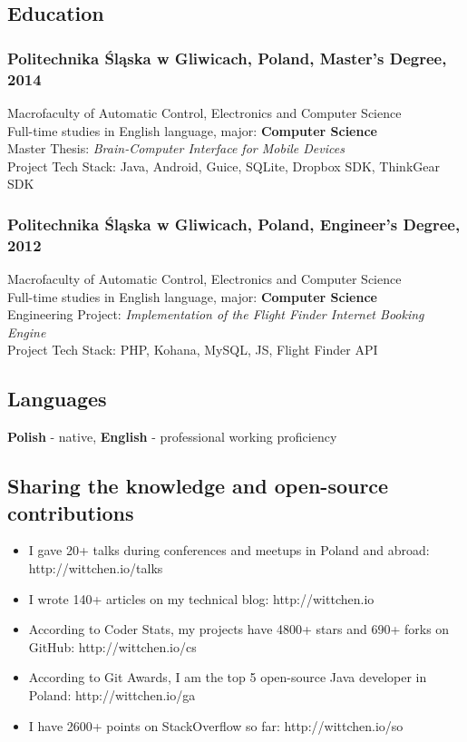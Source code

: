 \documentclass{article}
\begin{document}
    \subsection*{Education}

      \subsubsection*{Politechnika \'Sl\k{a}ska w Gliwicach, Poland, Master's Degree, 2014}
      Macrofaculty of Automatic Control, Electronics and Computer Science\\
      \small{Full-time studies in English language, major: \textbf{Computer Science}}\\
      \small{Master Thesis: \textit{Brain-Computer Interface for Mobile Devices}}\\
      \small{Project Tech Stack: Java, Android, Guice, SQLite, Dropbox SDK, ThinkGear SDK}

      \subsubsection*{Politechnika \'Sl\k{a}ska w Gliwicach, Poland, Engineer's Degree, 2012}
      Macrofaculty of Automatic Control, Electronics and Computer Science\\
      \small{Full-time studies in English language, major: \textbf{Computer Science}}\\
      \small{Engineering Project: \textit{Implementation of the Flight Finder Internet Booking Engine}}\\
      \small{Project Tech Stack: PHP, Kohana, MySQL, JS, Flight Finder API}

    \subsection*{Languages}
    \textbf{Polish} - native, \textbf{English} - professional working proficiency

    \subsection*{Sharing the knowledge and open-source contributions}
    \begin{itemize}
      \item I gave 20+ talks during conferences and meetups in Poland and abroad: http://wittchen.io/talks
      \item I wrote 140+ articles on my technical blog: http://wittchen.io
      \item According to Coder Stats, my projects have 4800+ stars and 690+ forks on GitHub: http://wittchen.io/cs
      \item According to Git Awards, I am the top 5 open-source Java developer in Poland: http://wittchen.io/ga
      \item I have 2600+ points on StackOverflow so far: http://wittchen.io/so
    \end{itemize}
\end{document}
